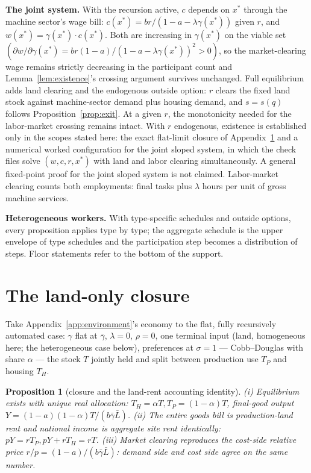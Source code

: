 \documentclass[12pt]{article}
\theoremstyle{plain}
\newtheorem{proposition}{Proposition}
\begin{document}
\textbf{The joint system.} With the recursion active, $c$ depends on $x^*$ through the machine sector's wage bill: $c(x^*) = br/(1 - a - \lambda \gamma (x^*))$ given $r$, and $w(x^*) = \gamma (x^*)\cdot c(x^*)$. Both are increasing in $\gamma (x^*)$ on the viable set $(\partial w/\partial \gamma (x^*) = br(1-a)/(1-a-\lambda \gamma (x^*))^2 > 0)$, so the market-clearing wage remains strictly decreasing in the participant count and Lemma~\ref{lem:existence}'s crossing argument survives unchanged. Full equilibrium adds land clearing and the endogenous outside option: $r$ clears the fixed land stock against machine-sector demand plus housing demand, and $s=s(q)$ follows Proposition~\ref{prop:exit}. At a given $r$, the monotonicity needed for the labor-market crossing remains intact. With $r$ endogenous, existence is established only in the scopes stated here: the exact flat-limit closure of Appendix~\ref{app:landonly} and a numerical worked configuration for the joint sloped system, in which the check files solve $(w,c,r,x^*)$ with land and labor clearing simultaneously. A general fixed-point proof for the joint sloped system is not claimed. Labor-market clearing counts both employments: final tasks plus $\lambda$ hours per unit of gross machine services.

\textbf{Heterogeneous workers.} With type-specific schedules and outside options, every proposition applies type by type; the aggregate schedule is the upper envelope of type schedules and the participation step becomes a distribution of steps. Floor statements refer to the bottom of the support.

\section{The land-only closure}\label{app:landonly}

Take Appendix~\ref{app:environment}'s economy to the flat, fully recursively automated case: $\gamma$ flat at $\bar{\gamma}$, $\lambda=0$, $\rho=0$, one terminal input (land, homogeneous here; the heterogeneous case below), preferences at $\sigma = 1$ --- Cobb--Douglas with share $\alpha$ --- the stock $T$ jointly held and split between production use $T_P$ and housing $T_H$.

\begin{proposition}[closure and the land-rent accounting identity]\label{prop:landonly}
(i) Equilibrium exists with unique real allocation: $T_H = \alpha T, T_P = (1-\alpha )T$, final-good output $Y = (1-a)(1-\alpha )T/(b\bar{\gamma}\bar{L})$. (ii) The entire goods bill is production-land rent and national income is aggregate site rent identically: $pY = rT_P, pY + rT_H = rT$. (iii) Market clearing reproduces the cost-side relative price $r/p = (1-a)/(b\bar{\gamma}\bar{L})$: demand side and cost side agree on the same number.
\end{proposition}
\end{document}

